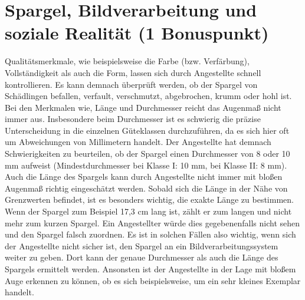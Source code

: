 \documentclass{ezb}
\begin{document}
\section{Spargel, Bildverarbeitung und soziale Realität (1 Bonuspunkt)}
Qualitätsmerkmale, wie beispielsweise die Farbe (bzw. Verfärbung), Vollständigkeit als auch die Form, lassen sich durch Angestellte schnell kontrollieren. Es kann demnach überprüft werden, ob der Spargel von Schädlingen befallen, verfault, verschmutzt, abgebrochen, krumm oder hohl ist.\\ 
\linebreak 
Bei den Merkmalen wie, Länge und Durchmesser reicht das Augenmaß nicht immer aus. Insbesondere beim Durchmesser ist es schwierig die präzise Unterscheidung in die einzelnen Güteklassen durchzuführen, da es sich hier oft um Abweichungen von Millimetern handelt. Der Angestellte hat demnach Schwierigkeiten zu beurteilen, ob der Spargel einen Durchmesser von 8 oder 10 mm aufweist (Mindestdurchmesser bei Klasse I: 10 mm, bei Klasse II: 8 mm). \\ 
\linebreak
Auch die Länge des Spargels kann durch Angestellte nicht immer mit bloßen Augenmaß richtig eingeschätzt werden. Sobald sich die Länge in der Nähe von Grenzwerten befindet, ist es besonders wichtig, die exakte Länge zu bestimmen. Wenn der Spargel zum Beispiel 17,3 cm lang ist, zählt er zum langen und nicht mehr zum kurzen Spargel. Ein Angestellter würde dies gegebenenfalls nicht sehen und den Spargel falsch zuordnen. Es ist in solchen Fällen also wichtig, wenn sich der Angestellte nicht sicher ist, den Spargel an ein Bildverarbeitungssystem weiter zu geben. Dort kann der genaue Durchmesser als auch die Länge des Spargels ermittelt werden. Ansonsten ist der Angestellte in der Lage mit bloßem Auge erkennen zu können, ob es sich beispielsweise, um ein sehr kleines Exemplar handelt.

\end{document}
